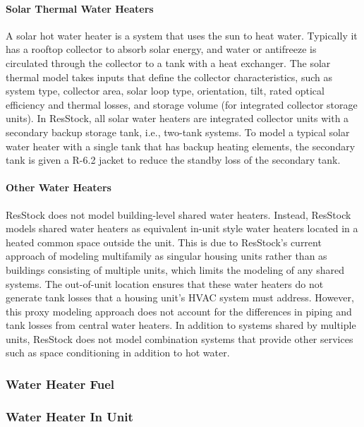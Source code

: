 \paragraph{Solar Thermal Water Heaters}
A solar hot water heater is a system that uses the sun to heat water. Typically it has a rooftop collector to absorb solar energy, and water or antifreeze is circulated through the collector to a tank with a heat exchanger. The solar thermal model takes inputs that define the collector characteristics, such as system type, collector area, solar loop type, orientation, tilt, rated optical efficiency and thermal losses, and storage volume (for integrated collector storage units). In ResStock, all solar water heaters are integrated collector units with a secondary backup storage tank, i.e., two-tank systems. To model a typical solar water heater with a single tank that has backup heating elements, the secondary tank is given a R-6.2 jacket to reduce the standby loss of the secondary tank.


\paragraph{Other Water Heaters}
ResStock does not model building-level shared water heaters. Instead, ResStock models shared water heaters as equivalent in-unit style water heaters located in a heated common space outside the unit. This is due to ResStock’s current approach of modeling multifamily as singular housing units rather than as buildings consisting of multiple units, which limits the modeling of any shared systems. The out-of-unit location ensures that these water heaters do not generate tank losses that a housing unit's HVAC system must address. However, this proxy modeling approach does not account for the differences in piping and tank losses from central water heaters. In addition to systems shared by multiple units, ResStock does not model combination systems that provide other services such as space conditioning in addition to hot water.

\subsubsection{Water Heater Fuel}\label{water_heater_fuel}


\subsubsection{Water Heater In Unit}\label{water_heater_in_unit}


